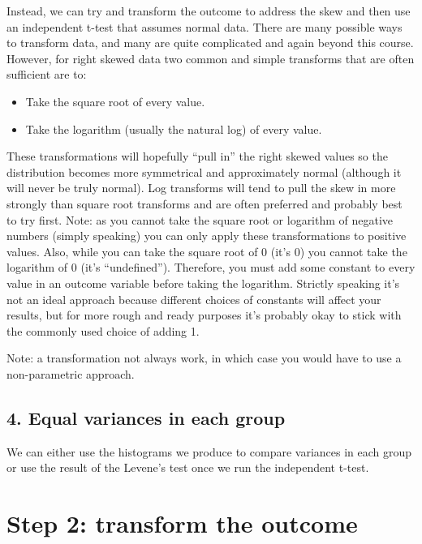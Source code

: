\documentclass[
]{book}
\begin{document}
Instead, we can try and transform the outcome to address the skew and then use an independent t-test that assumes normal data. There are many possible ways to transform data, and many are quite complicated and again beyond this course. However, for right skewed data two common and simple transforms that are often sufficient are to:

\begin{itemize}
\item
  Take the square root of every value.
\item
  Take the logarithm (usually the natural log) of every value.
\end{itemize}

These transformations will hopefully ``pull in'' the right skewed values so the distribution becomes more symmetrical and approximately normal (although it will never be truly normal). Log transforms will tend to pull the skew in more strongly than square root transforms and are often preferred and probably best to try first. Note: as you cannot take the square root or logarithm of negative numbers (simply speaking) you can only apply these transformations to positive values. Also, while you can take the square root of 0 (it's 0) you cannot take the logarithm of 0 (it's ``undefined''). Therefore, you must add some constant to every value in an outcome variable before taking the logarithm. Strictly speaking it's not an ideal approach because different choices of constants will affect your results, but for more rough and ready purposes it's probably okay to stick with the commonly used choice of adding 1.

Note: a transformation not always work, in which case you would have to use a non-parametric approach.

\hypertarget{equal-variances-in-each-group}{%
\subsection{4. Equal variances in each group}\label{equal-variances-in-each-group}}

We can either use the histograms we produce to compare variances in each group or use the result of the Levene's test once we run the independent t-test.

\hypertarget{step-2-transform-the-outcome}{%
\section{Step 2: transform the outcome}\label{step-2-transform-the-outcome}}
\end{document}
